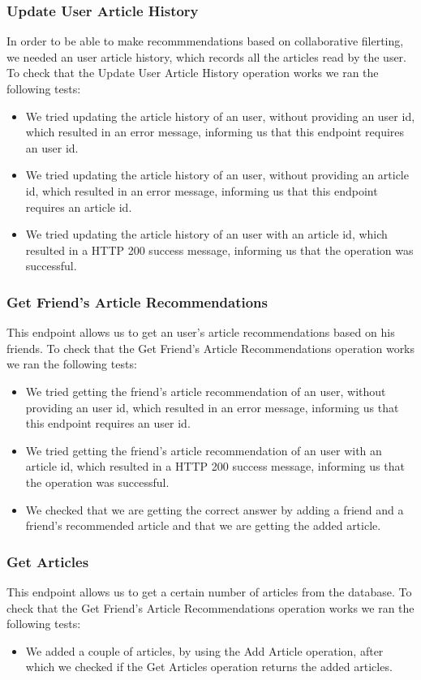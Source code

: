\subsubsection{Update User Article History}
\label{sec:basic-operations-add-user}
In order to be able to make recommmendations based on collaborative filerting, we  needed an  user article history, which records all the articles read by the user. To check that the Update User Article History operation works we ran the following tests: 
\begin{itemize}
	\item We tried updating the article history of an user, without providing an user id, which resulted in an error message, informing us that this endpoint requires an user id.
	\item We tried updating the article history of an user, without providing an article id, which resulted in an error message, informing us that this endpoint requires an article id.
	\item We tried updating the article history of an user with an article id, which resulted in a HTTP 200 success message, informing us that the operation was successful.
\end{itemize}


\subsubsection{Get Friend's Article Recommendations}
\label{sec:basic-operations-add-user}
This endpoint allows us to get an user's article recommendations based on his friends. To check that the Get Friend's Article Recommendations operation works we ran the following tests: 
\begin{itemize}
	\item We tried getting the friend's article recommendation of an user, without providing an user id, which resulted in an error message, informing us that this endpoint requires an user id.
	\item We tried getting the friend's article recommendation of an user with an article id, which resulted in a HTTP 200 success message, informing us that the operation was successful.
	\item We checked that we are getting the correct answer by adding a friend and a friend's recommended article and that we are getting the added article.
\end{itemize}

\subsubsection{Get Articles}
\label{sec:basic-operations-add-user}
This endpoint allows us to get a certain number of articles from the database. To check that the Get Friend's Article Recommendations operation works we ran the following tests: 
\begin{itemize}
	\item We added a couple of articles, by using the Add Article operation, after which we checked if the Get Articles operation returns the added articles.
\end{itemize}


